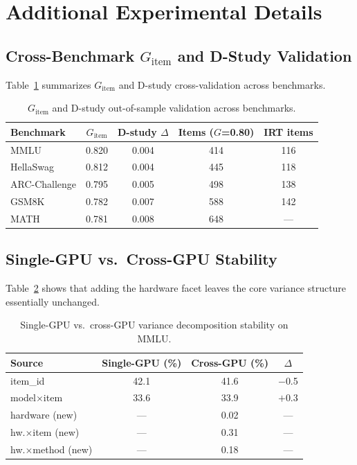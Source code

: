 \documentclass[11pt,a4paper]{article}
\newcommand{\Gcoeff}{\ensuremath{G}}
\begin{document}
\clearpage
\appendix
\section{Additional Experimental Details}

\subsection{Cross-Benchmark $\Gcoeff_\text{item}$ and D-Study Validation}

Table~\ref{tab:gitem-cross} summarizes $\Gcoeff_\text{item}$ and D-study cross-validation across benchmarks.

\begin{table}[h]
\centering
\caption{$\Gcoeff_\text{item}$ and D-study out-of-sample validation across benchmarks.}
\label{tab:gitem-cross}
\small
\begin{tabular}{lcccc}
\toprule
\textbf{Benchmark} & \textbf{$\Gcoeff_\text{item}$} & \textbf{D-study $\Delta$} & \textbf{Items ($\Gcoeff$=0.80)} & \textbf{IRT items} \\
\midrule
MMLU          & 0.820 & 0.004 & 414 & 116 \\
HellaSwag     & 0.812 & 0.004 & 445 & 118 \\
ARC-Challenge & 0.795 & 0.005 & 498 & 138 \\
GSM8K         & 0.782 & 0.007 & 588 & 142 \\
MATH          & 0.781 & 0.008 & 648 & --- \\
\bottomrule
\end{tabular}
\end{table}

\subsection{Single-GPU vs.\ Cross-GPU Stability}

Table~\ref{tab:crossgpu-stability} shows that adding the hardware facet leaves the core variance structure essentially unchanged.

\begin{table}[h]
\centering
\caption{Single-GPU vs.\ cross-GPU variance decomposition stability on MMLU.}
\label{tab:crossgpu-stability}
\small
\begin{tabular}{lccc}
\toprule
\textbf{Source} & \textbf{Single-GPU (\%)} & \textbf{Cross-GPU (\%)} & \textbf{$\Delta$} \\
\midrule
item\_id            & 42.1 & 41.6 & $-$0.5 \\
model$\times$item   & 33.6 & 33.9 & $+$0.3 \\
hardware (new)      & ---  &  0.02 & --- \\
hw.$\times$item (new) & --- & 0.31 & --- \\
hw.$\times$method (new) & --- & 0.18 & --- \\
\bottomrule
\end{tabular}
\end{table}
\end{document}
